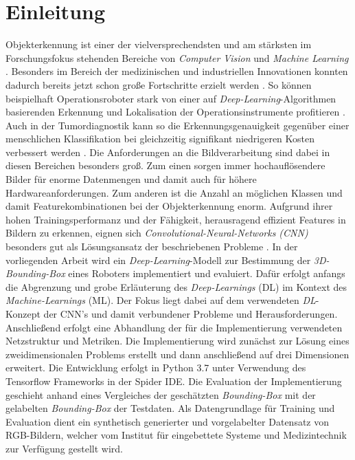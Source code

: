 \section{Einleitung}

Objekterkennung ist einer der vielversprechendsten und am stärksten im Forschungsfokus stehenden Bereiche von \textit{Computer Vision} und \textit{Machine Learning} \cite{Ouyang2014}. Besonders im Bereich der medizinischen und industriellen Innovationen konnten dadurch bereits jetzt schon große Fortschritte erzielt werden  \cite{Tremblay1809, Abstract2016}. So können beispielhaft Operationsroboter stark von einer auf \textit{Deep-Learning}-Algorithmen basierenden Erkennung und Lokalisation der Operationsinstrumente profitieren \cite{Surgery1803}. Auch in der Tumordiagnostik kann so die Erkennungsgenauigkeit gegenüber einer menschlichen Klassifikation bei gleichzeitig signifikant niedrigeren Kosten verbessert werden \cite{Cruz-Roa2017}.\newline
Die Anforderungen an die Bildverarbeitung sind dabei in diesen Bereichen besonders groß. Zum einen sorgen immer hochauflösendere Bilder für enorme Datenmengen und damit auch für höhere Hardwareanforderungen. Zum anderen ist die Anzahl an möglichen Klassen und damit Featurekombinationen bei der Objekterkennung enorm. Aufgrund ihrer hohen Trainingsperformanz und der Fähigkeit, herausragend effizient Features in Bildern zu erkennen, eignen sich \textit{Convolutional-Neural-Networks (CNN)} besonders gut als Lösungsansatz der beschriebenen Probleme \cite{Ouyang2014}.\newline
In der vorliegenden Arbeit wird ein \textit{Deep-Learning}-Modell zur Bestimmung der \textit{3D-Bounding-Box} eines Roboters implementiert und evaluiert.  Dafür erfolgt anfangs die Abgrenzung und grobe Erläuterung des \textit{Deep-Learnings} (DL) im Kontext des \textit{Machine-Learnings} (ML). Der Fokus liegt dabei auf dem verwendeten \textit{DL}-Konzept der CNN's und damit verbundener Probleme und Herausforderungen. Anschließend erfolgt eine Abhandlung der für die Implementierung verwendeten Netzstruktur und Metriken. Die Implementierung wird zunächst zur Lösung eines zweidimensionalen Problems erstellt und dann anschließend auf drei Dimensionen erweitert. Die Entwicklung erfolgt in Python 3.7 unter Verwendung des Tensorflow Frameworks in der Spider IDE. Die Evaluation der Implementierung geschieht anhand eines Vergleiches der geschätzten \textit{Bounding-Box} mit der gelabelten \textit{Bounding-Box} der Testdaten. Als Datengrundlage für Training und Evaluation dient ein synthetisch generierter und vorgelabelter Datensatz von RGB-Bildern, welcher vom Institut für eingebettete Systeme und Medizintechnik zur Verfügung gestellt wird.   